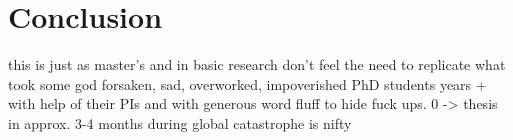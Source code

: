 \chapter{Conclusion}
	this is just as master’s and in basic research don’t feel the need to replicate what took some god forsaken, sad, overworked, impoverished PhD students years + with help of their PIs and with generous word fluff to hide fuck ups. 0 -> thesis in approx. 3-4 months during global catastrophe is nifty